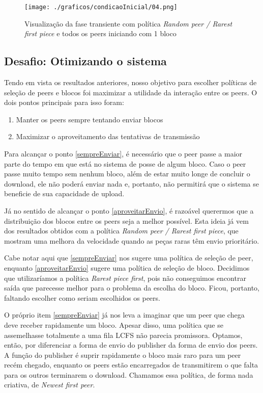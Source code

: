 \documentclass[a4paper,10pt]{article}
\begin{document}
\begin{figure}
	\caption{Visualização da fase transiente com política \textit{Random peer / Rarest first piece} e todos os peers iniciando com 1 bloco}
	\label{figCI1rf}
	\texttt{[image: ./graficos/condicaoInicial/04.png]}
\end{figure}

\clearpage
\pagebreak

\subsection{Desafio: Otimizando o sistema}

Tendo em vista os resultados anteriores, nosso objetivo para escolher políticas de seleção de peers e blocos foi maximizar a utilidade da interação entre os peers. O dois pontos principais para isso foram:
\begin{enumerate}
	\item \label{sempreEnviar} Manter os peers sempre tentando enviar blocos
	\item \label{aproveitarEnvio} Maximizar o aproveitamento das tentativas de transmissão
\end{enumerate}

Para alcançar o ponto \ref{sempreEnviar}, é necessário que o peer passe a maior parte do tempo em que está no sistema de posse de algum bloco. Caso o peer passe muito tempo sem nenhum bloco, além de estar muito longe de concluir o download, ele não poderá enviar nada e, portanto, não permitirá que o sistema se beneficie de sua capacidade de upload.

Já no sentido de alcançar o ponto \ref{aproveitarEnvio}, é razoável querermos que a distribuição dos blocos entre os peers seja a melhor possível. Esta ideia já vem dos resultados obtidos com a política \textit{Random peer / Rarest first piece}, que mostram uma melhora da velocidade quando as peças raras têm envio prioritário.

Cabe notar aqui que \ref{sempreEnviar} nos sugere uma política de seleção de peer, enquanto \ref{aproveitarEnvio} sugere uma política de seleção de bloco. Decidimos que utilizaríamos a política \textit{Rarest piece first}, pois não conseguimos encontrar saída que parecesse melhor para o problema da escolha do bloco. Ficou, portanto, faltando escolher como seriam escolhidos os peers.

O próprio item \ref{sempreEnviar} já nos leva a imaginar que um peer que chega deve receber rapidamente um bloco. Apesar disso, uma política que se assemelhasse totalmente a uma fila LCFS não parecia promissora. Optamos, então, por diferenciar a forma de envio do publisher da forma de envio dos peers. A função do publisher é suprir rapidamente o bloco mais raro para um peer recém chegado, enquanto os peers estão encarregados de transmitirem o que falta para os outros terminarem o download. Chamamos essa política, de forma nada criativa, de \textit{Newest first peer}.
\end{document}
